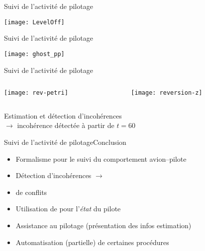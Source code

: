\documentclass[compress]{beamer}
\begin{document}
\begin{frame}{Suivi de l'activité de pilotage}
\begin{center}
\texttt{[image: LevelOff]}
\end{center}
\end{frame}

\begin{frame}{Suivi de l'activité de pilotage}
\begin{center}
\texttt{[image: ghost\_pp]}
\end{center}
\end{frame}

\begin{frame}{Suivi de l'activité de pilotage}
\begin{columns}
\begin{column}{0.5\linewidth}
	\texttt{[image: rev-petri]}
\end{column}
\begin{column}{0.5\linewidth}
	\texttt{[image: reversion-z]}
\end{column}
\end{columns}
\begin{center}
\small Estimation et détection d'incohérences\\
\alert{$\rightarrow$ incohérence détectée à partir de $t = 60$}
\end{center}
\end{frame}

\begin{frame}{Suivi de l'activité de pilotage}{Conclusion}
\begin{itemize}
\item Formalisme pour le suivi du comportement avion--pilote
\item Détection d'incohérences $\rightarrow$ 
\item {} de conflits
\item Utilisation de  pour l'{\it état} du pilote
\item Assistance au pilotage (présentation des infos estimation)
\item Automatisation (partielle) de certaines procédures
\end{itemize}
\end{frame}
\end{document}
